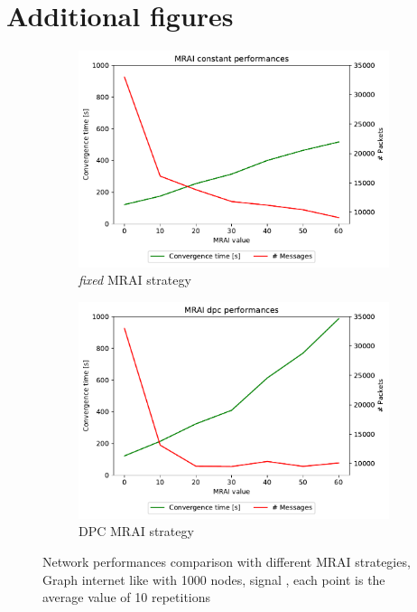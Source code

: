 \chapter{Additional figures}
\label{cha:appendx}

\begin{figure}[h]
     \centering
     \begin{subfigure}[b]{0.49\textwidth}
         \centering
         \includegraphics[width=\textwidth]{images/internet_like/1000/signals/AWAW/constant/internet_like-constant_AWAW_mrai_evolution.pdf}
		 \caption{\textit{fixed} \ac{MRAI} strategy}
         \label{fig:internet_like_1000_fixed_AWAW}
     \end{subfigure}
     \hfill
     \begin{subfigure}[b]{0.49\textwidth}
         \centering
         \includegraphics[width=\textwidth]{images/internet_like/1000/signals/AWAW/dpc/internet_like-DPC_AWAW_mrai_evolution.pdf}
		 \caption{\ac{DPC} \ac{MRAI} strategy}
         \label{fig:internet_like_1000_dpc_AWAW}
     \end{subfigure}
	 \caption{Network performances comparison with different \ac{MRAI} strategies,
		Graph internet like with \num{1000} nodes, signal , each point is
		the average value of \num{10} repetitions}
        \label{fig:internt_like_1000_evolution_AWAW}
\end{figure}

